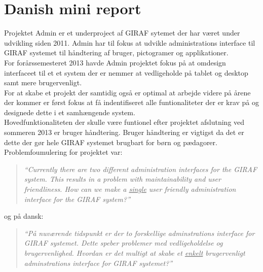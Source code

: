 \section{Danish mini report}
Projektet Admin er et underproject af GIRAF sytemet der har været under udvikling siden 2011. Admin har til fokus at udvikle administrations interface til GIRAF systemet til håndtering af bruger, pictogramer og applikationer.\\
For forårssemesteret 2013 havde Admin projektet fokus på at omdesign interfaceet til et et system der er nemmer at vedligeholde på tablet og desktop samt mere brugervenligt.\\
For at skabe et projekt der samtidig også er optimal at arbejde videre på årene der kommer er først fokus at få indentifiseret alle funtionaliteter der er krav på og designede dette i et samhængende system.\\
Hovedfunktionaliteten der skulle være funtionel efter projektet afslutning ved sommeren 2013 er bruger håndtering.   
Bruger håndtering er vigtigst da det er dette der gør hele GIRAF systemet brugbart for børn og pædagorer. \\

Problemfoumulering for projektet var: 
\begin{verse}
\textit{``Currently there are two different administration interfaces for the GIRAF system.
This results in a problem with maintainability and user friendliness.
How can we make a \underline{single} user friendly administration interface for the GIRAF system?''}
\end{verse}

og på dansk: 
\begin{verse}
\textit{``På nuværende tidspunkt er der to forskellige adminstrations interface for GIRAF systemet.
Dette speber problemer med vedligeholdelse og brugervenlighed. 
Hvordan er det multigt at skabe et \underline{enkelt} brugervenligt adminstrations interface for GIRAF systemet?''}
\end{verse}


